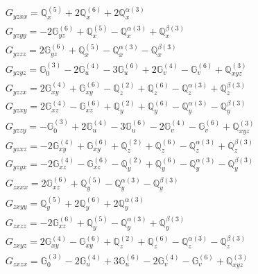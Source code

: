 \documentclass[fleqn,8pt,landscape]{jsarticle}
\begin{document}
\begin{align*}
& G_{yzxx} = \mathbb{Q}_{x}^{(5)} + 2 \mathbb{Q}_{x}^{(6)} + 2 \mathbb{Q}_{x}^{\alpha(3)} \\
& G_{yzyy} = - 2 \mathbb{G}_{yz}^{(6)} + \mathbb{Q}_{x}^{(5)} - \mathbb{Q}_{x}^{\alpha(3)} + \mathbb{Q}_{x}^{\beta(3)} \\
& G_{yzzz} = 2 \mathbb{G}_{yz}^{(6)} + \mathbb{Q}_{x}^{(5)} - \mathbb{Q}_{x}^{\alpha(3)} - \mathbb{Q}_{x}^{\beta(3)} \\
& G_{yzyz} = \mathbb{G}_{0}^{(3)} - 2 \mathbb{G}_{u}^{(4)} - 3 \mathbb{G}_{u}^{(6)} + 2 \mathbb{G}_{v}^{(4)} - \mathbb{G}_{v}^{(6)} + \mathbb{Q}_{xyz}^{(3)} \\
& G_{yzzx} = 2 \mathbb{G}_{xy}^{(4)} + \mathbb{G}_{xy}^{(6)} - \mathbb{Q}_{z}^{(2)} + \mathbb{Q}_{z}^{(6)} - \mathbb{Q}_{z}^{\alpha(3)} + \mathbb{Q}_{z}^{\beta(3)} \\
& G_{yzxy} = 2 \mathbb{G}_{xz}^{(4)} - \mathbb{G}_{xz}^{(6)} + \mathbb{Q}_{y}^{(2)} + \mathbb{Q}_{y}^{(6)} - \mathbb{Q}_{y}^{\alpha(3)} - \mathbb{Q}_{y}^{\beta(3)} \\
& G_{yzzy} = - \mathbb{G}_{0}^{(3)} + 2 \mathbb{G}_{u}^{(4)} - 3 \mathbb{G}_{u}^{(6)} - 2 \mathbb{G}_{v}^{(4)} - \mathbb{G}_{v}^{(6)} + \mathbb{Q}_{xyz}^{(3)} \\
& G_{yzxz} = - 2 \mathbb{G}_{xy}^{(4)} + \mathbb{G}_{xy}^{(6)} + \mathbb{Q}_{z}^{(2)} + \mathbb{Q}_{z}^{(6)} - \mathbb{Q}_{z}^{\alpha(3)} + \mathbb{Q}_{z}^{\beta(3)} \\
& G_{yzyx} = - 2 \mathbb{G}_{xz}^{(4)} - \mathbb{G}_{xz}^{(6)} - \mathbb{Q}_{y}^{(2)} + \mathbb{Q}_{y}^{(6)} - \mathbb{Q}_{y}^{\alpha(3)} - \mathbb{Q}_{y}^{\beta(3)} \\
& G_{zxxx} = 2 \mathbb{G}_{xz}^{(6)} + \mathbb{Q}_{y}^{(5)} - \mathbb{Q}_{y}^{\alpha(3)} - \mathbb{Q}_{y}^{\beta(3)} \\
& G_{zxyy} = \mathbb{Q}_{y}^{(5)} + 2 \mathbb{Q}_{y}^{(6)} + 2 \mathbb{Q}_{y}^{\alpha(3)} \\
& G_{zxzz} = - 2 \mathbb{G}_{xz}^{(6)} + \mathbb{Q}_{y}^{(5)} - \mathbb{Q}_{y}^{\alpha(3)} + \mathbb{Q}_{y}^{\beta(3)} \\
& G_{zxyz} = 2 \mathbb{G}_{xy}^{(4)} - \mathbb{G}_{xy}^{(6)} + \mathbb{Q}_{z}^{(2)} + \mathbb{Q}_{z}^{(6)} - \mathbb{Q}_{z}^{\alpha(3)} - \mathbb{Q}_{z}^{\beta(3)} \\
& G_{zxzx} = \mathbb{G}_{0}^{(3)} - 2 \mathbb{G}_{u}^{(4)} + 3 \mathbb{G}_{u}^{(6)} - 2 \mathbb{G}_{v}^{(4)} - \mathbb{G}_{v}^{(6)} + \mathbb{Q}_{xyz}^{(3)} \\

\end{align*}
\end{document}
